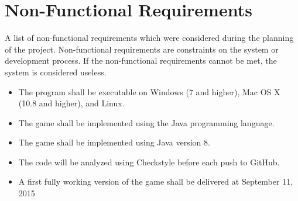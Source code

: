 \section{Non-Functional Requirements}

A list of non-functional requirements which were considered during the planning of the project. Non-functional requirements are constraints on the system or development process. If the non-functional requirements cannot be met, the system is considered useless. 

\begin{itemize}
	\item The program shall be executable on Windows (7 and higher), Mac OS X (10.8 and higher), and Linux.
	\item The game shall be implemented using the Java programming language.
	\item The game shall be implemented using Java version 8.
	\item The code will be analyzed using Checkstyle before each push to GitHub.
	\item A first fully working version of the game shall be delivered at September 11, 2015
\end{itemize}